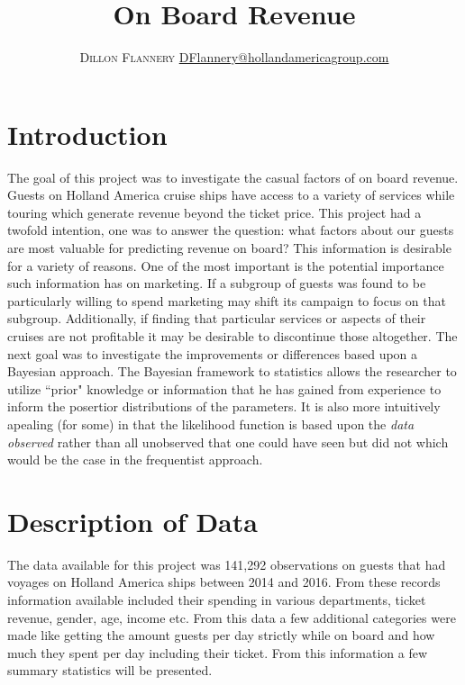 \documentclass[twoside,twocolumn]{article}
\title{On Board Revenue} %
\author{%
\textsc{Dillon Flannery}
\normalsize \href{mailto:DFlannery@hollandamericagroup.com}{DFlannery@hollandamericagroup.com}
}
\begin{document}
\maketitle
\section{Introduction}
The goal of this project was to investigate the casual factors of on board revenue. Guests on Holland America cruise ships have access to a variety of services while touring which generate revenue beyond the ticket price. This project had a twofold intention, one was to answer the question: what factors about our guests are most valuable for predicting revenue on board? This information is desirable for a variety of reasons. One of the most important is the potential importance such information has on marketing. If a subgroup of guests was found to be particularly willing to spend marketing may shift its campaign to focus on that subgroup. Additionally, if finding that particular services or aspects of their cruises are not profitable it may be desirable to discontinue those altogether. The next goal was to investigate the improvements or differences based upon a Bayesian approach. The Bayesian framework to statistics allows the researcher to utilize ``prior" knowledge or information that he has gained from experience to inform the posertior distributions of the parameters. It is also more intuitively apealing (for some) in that the likelihood function is based upon the \textit{data observed} rather than all unobserved that one could have seen but did not which would be the case in the frequentist approach. 

\section{Description of Data}
The data available for this project was 141,292 observations on guests that had voyages on Holland America ships between 2014 and 2016. From these records information available included their spending in various departments, ticket revenue, gender, age, income etc. From this data a few additional categories were made like getting the amount guests per day strictly while on board and how much they spent per day including their ticket. From this information a few summary statistics will be presented. \\
\end{document}

